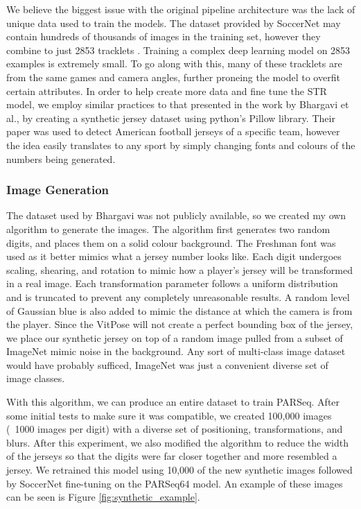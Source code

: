 \documentclass[11pt, letterpaper]{article}
\begin{document}
We believe the biggest issue with the original pipeline architecture was the lack of unique data used to train the models. The dataset provided by SoccerNet may contain hundreds of thousands of images in the training set, however they combine to just 2853 tracklets \cite{soccernet_repo}. Training a complex deep learning model on 2853 examples is extremely small. To go along with this, many of these tracklets are from the same games and camera angles, further proneing the model to overfit certain attributes. In order to help create more data and fine tune the STR model, we employ similar practices to that presented in the work by Bhargavi et al., by creating a synthetic jersey dataset using python's Pillow library. Their paper was used to detect American football jerseys of a specific team, however the idea easily translates to any sport by simply changing fonts and colours of the numbers being generated. 

\subsubsection{Image Generation}

The dataset used by Bhargavi was not publicly available, so we created my own algorithm to generate the images. The algorithm first generates two random digits, and places them on a solid colour background. The Freshman font was used as it better mimics what a jersey number looks like. Each digit undergoes scaling, shearing, and rotation to mimic how a player's jersey will be transformed in a real image. Each transformation parameter follows a uniform distribution and is truncated to prevent any completely unreasonable results. A random level of Gaussian blue is also added to mimic the distance at which the camera is from the player. Since the VitPose will not create a perfect bounding box of the jersey, we place our synthetic jersey on top of a random image pulled from a subset of ImageNet mimic noise in the background. Any sort of multi-class image dataset would have probably sufficed, ImageNet was just a convenient diverse set of image classes.

With this algorithm, we can produce an entire dataset to train PARSeq. After some initial tests to make sure it was compatible, we created 100,000 images (~1000 images per digit) with a diverse set of positioning, transformations, and blurs. After this experiment, we also modified the algorithm to reduce the width of the jerseys so that the digits were far closer together and more resembled a jersey. We retrained this model using 10,000 of the new synthetic images followed by SoccerNet fine-tuning on the PARSeq64 model. An example of these images can be seen is Figure \ref{fig:synthetic_example}.
\end{document}
